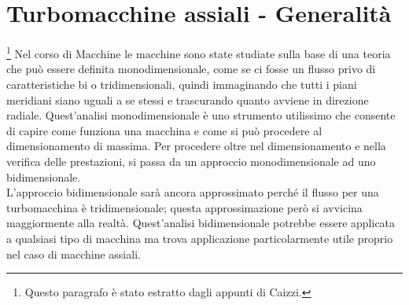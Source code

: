\chapter{Turbomacchine assiali - Generalità}
\footnote{Questo paragrafo è stato estratto dagli appunti di Caizzi.} Nel corso di Macchine le macchine sono state studiate sulla base di una teoria che può essere definita monodimensionale, come se ci fosse un flusso privo di caratteristiche bi o tridimensionali, quindi immaginando che tutti i piani meridiani siano uguali a se stessi e trascurando quanto avviene in direzione radiale. Quest'analisi monodimensionale è uno strumento utilissimo che consente di capire come funziona una macchina e come si può procedere al dimensionamento di massima. Per procedere oltre nel dimensionamento e nella verifica delle prestazioni, si passa da un approccio monodimensionale ad uno bidimensionale.\\
L’approccio bidimensionale sarà ancora approssimato perché il flusso per una turbomacchina è tridimensionale; questa approssimazione però si avvicina maggiormente alla realtà. Quest'analisi bidimensionale potrebbe essere applicata a qualsiasi tipo di macchina ma trova applicazione particolarmente utile proprio nel caso di macchine assiali.

